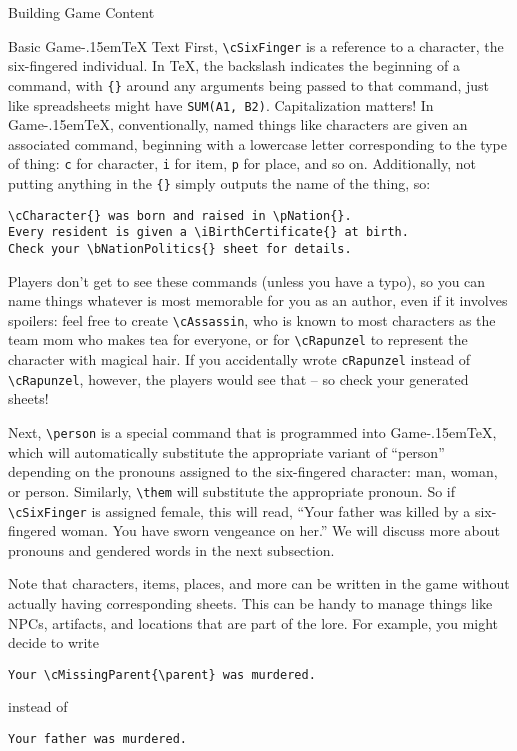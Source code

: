 \documentclass[11pt,  total={6in, 8in}]{article}
\def\gametex{\mbox{Game\kern-.15em\TeX}}
\begin{document}
\begin{section}{Building Game Content}
\begin{subsection}{Basic \gametex{} Text}
First, \lstinline{\cSixFinger} is a reference to a character, the six-fingered individual.  In \TeX{}, the backslash indicates the beginning of a command, with \lstinline|{}| around any arguments being passed to that command, just like spreadsheets might have \texttt{SUM(A1, B2)}.  Capitalization matters!  In \gametex{}, conventionally, named things like characters are given an associated command, beginning with a lowercase letter corresponding to the type of thing: \lstinline{c} for character, \lstinline{i} for item, \lstinline{p} for place, and so on.  Additionally, not putting anything in the \lstinline|{}| simply outputs the name of the thing, so: 
\begin{verbatim}
\cCharacter{} was born and raised in \pNation{}.
Every resident is given a \iBirthCertificate{} at birth.
Check your \bNationPolitics{} sheet for details.
\end{verbatim}

Players don't get to see these commands (unless you have a typo), so you can name things whatever is most memorable for you as an author, even if it involves spoilers: feel free to create \lstinline|\cAssassin|, who is known to most characters as the team mom who makes tea for everyone, or for \lstinline{\cRapunzel} to represent the character with magical hair.  If you accidentally wrote \lstinline{cRapunzel} instead of \lstinline{\cRapunzel}, however, the players would see that -- so check your generated sheets!

Next, \lstinline{\person} is a special command that is programmed into \gametex{}, which will automatically substitute the appropriate variant of ``person'' depending on the pronouns assigned to the six-fingered character: man, woman, or person.  Similarly, \lstinline{\them} will substitute the appropriate pronoun.  So if \lstinline{\cSixFinger} is assigned female, this will read, ``Your father was killed by a six-fingered woman.  You have sworn vengeance on her.''  We will discuss more about pronouns and gendered words in the next subsection.

Note that characters, items, places, and more can be written in the game without actually having corresponding sheets.  This can be handy to manage things like NPCs, artifacts, and locations that are part of the lore.  For example, you might decide to write 
\begin{verbatim}
Your \cMissingParent{\parent} was murdered.
\end{verbatim}
instead of 
\begin{verbatim}
Your father was murdered.
\end{verbatim}


\end{subsection}
\end{section}
\end{document}
